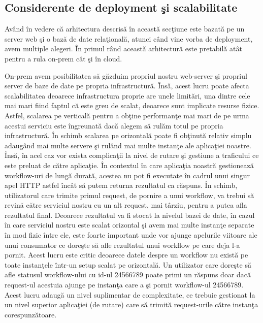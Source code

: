 \subsection{Considerente de deployment şi scalabilitate}
\quad Având în vedere că arhitectura descrisă în această secţiune este bazată pe un server web şi o bază de date relaţională, atunci când vine vorba de deployment, avem multiple alegeri. În primul rând această arhitectură este pretabilă atât pentru a rula on-prem cât şi în cloud. 
\par On-prem avem posibilitatea să găzduim propriul nostru web-server şi propriul server de baze de date pe propria infrastructură. Însă, acest lucru poate afecta scalabilitatea deoarece infrastructura proprie are unele limitări, una dintre cele mai mari fiind faptul că este greu de scalat, deoarece sunt implicate resurse fizice. Astfel, scalarea pe verticală pentru a obţine performanţe mai mari de pe urma acestui serviciu este îngreunată dacă alegem să rulăm totul pe propria infrastructură. În schimb scalarea pe orizontală poate fi obţinută relativ simplu adaugând mai multe servere şi rulând mai multe instanţe ale aplicaţiei noastre. Însă, în acel caz vor exista complicaţii la nivel de rutare şi gestiune a traficului ce este preluat de către aplicaţie. În contextul în care aplicaţia noastră gestionează workflow-uri de lungă durată, acestea nu pot fi executate în cadrul unui singur apel HTTP astfel încât să putem returna rezultatul ca răspuns. În schimb, utilizatorul care trimite primul request, de pornire a unui workflow, va trebui să revină către serviciul nostru cu un alt request, mai târziu, pentru a putea afla rezultatul final. Deoarece rezultatul va fi stocat la nivelul bazei de date, în cazul în care serviciul nostru este scalat orizontal şi avem mai multe instanţe separate în mod fizic între ele, este foarte important unde vor ajunge apelurile viitoare ale unui consumator ce doreşte să afle rezultatul unui workflow pe care deja l-a pornit. Acest lucru este critic deoarece datele despre un workflow nu există pe toate instanţele într-un setup scalat pe orizontală. Un utilizator care doreşte să afle statusul workflow-ului cu id-ul 24566789 poate primi un răspuns doar dacă request-ul acestuia ajunge pe instanţa care a şi pornit workflow-ul 24566789. Acest lucru adaugă un nivel suplimentar de complexitate, ce trebuie gestionat la un nivel superior aplicaţiei (de rutare) care să trimită request-urile către instanţa corespunzătoare.
